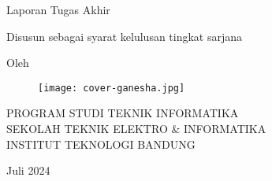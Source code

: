 \clearpage
\pagestyle{empty}

\begin{center}
  \smallskip
  
  \Large \bfseries \MakeUppercase{\thetitle}
  \vfill
  
  \Large Laporan Tugas Akhir
  \vfill
  
  \large Disusun sebagai syarat kelulusan tingkat sarjana
  \vfill
  
  \large Oleh
  
  \Large \theauthor
  
  \vfill
  \begin{figure}[ht]
    \centering
    \texttt{[image: cover-ganesha.jpg]}
  \end{figure}
  \vfill
  
  \large
  \uppercase{
    Program Studi Teknik Informatika \\
    Sekolah Teknik Elektro \& Informatika \\
    Institut Teknologi Bandung
  }
  
  Juli 2024
  
\end{center}

\clearpage
